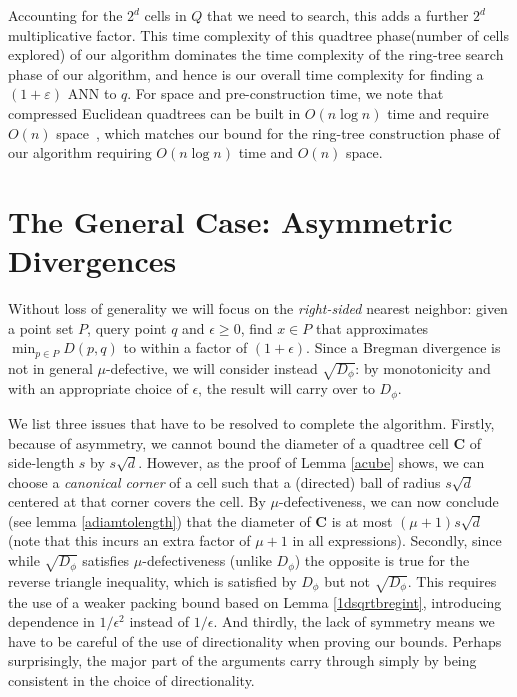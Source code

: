 \documentclass[11pt]{myclass}
\newcommand{\breg}{\ensuremath{D_\phi}}
\newcommand{\eps}{\varepsilon}
\begin{document}
Accounting for the $2^d$ cells in $Q$ that we need to search, this adds a further $2^d$ multiplicative factor.
This time complexity of this quadtree phase(number of cells explored) of our algorithm dominates the time complexity of the ring-tree 
search phase of our algorithm, and hence is our overall time
complexity for finding a $(1+ \eps)$ ANN to $q$.
For space and pre-construction time, we note that compressed Euclidean quadtrees can be built in $O(n \log n)$ time and require $O(n)$ space~\cite{snotes},
which matches our bound for the ring-tree construction phase of our algorithm requiring $O(n \log n)$ time and $O(n)$ space. 

\section{The General Case: Asymmetric Divergences}\label{sec:generalizations}

Without loss of generality we will focus on the \emph{right-sided} nearest neighbor: given a point set $P$, query point $q$ and $\epsilon \ge 0$, find $x \in P$ that approximates $\min_{p \in P} D(p, q)$ to within a factor of $(1+\epsilon)$.  Since a Bregman divergence is not in general $\mu$-defective, we will consider instead $\sqrt{\breg}$: by monotonicity and with an appropriate choice of $\epsilon$, the result will carry over to $\breg$. 

We list  three issues that have to be resolved to complete the algorithm. Firstly, because of asymmetry, we cannot bound the diameter of a 
quadtree cell $\textbf{C}$ of side-length $s$ by $s\sqrt{d}$. However, as the proof of Lemma \ref{acube} shows, we can 
choose a \emph{canonical corner} of a cell such that a (directed) ball of radius $s\sqrt{d}$ centered at that corner covers the cell. 
By $\mu$-defectiveness, we can now conclude (see lemma \ref{adiamtolength}) that the diameter of $\mathbf{C}$ is at most $(\mu+1)s\sqrt{d}$ (note that this incurs an extra 
factor of $\mu+1$ in all expressions). Secondly, since while $\sqrt{\breg}$ satisfies $\mu$-defectiveness (unlike $\breg$) the opposite is 
true for the reverse triangle inequality, which is satisfied by $\breg$ but not $\sqrt{\breg}$. This requires the use of a weaker packing 
bound based on Lemma \ref{1dsqrtbregint}, introducing dependence in $1/\epsilon^2$ instead of $1/\epsilon$. And thirdly, the lack of symmetry means
we have to be careful of the use of directionality when proving our bounds. Perhaps surprisingly, the major part of the arguments
carry through simply by being consistent in the choice of directionality.
\end{document}
